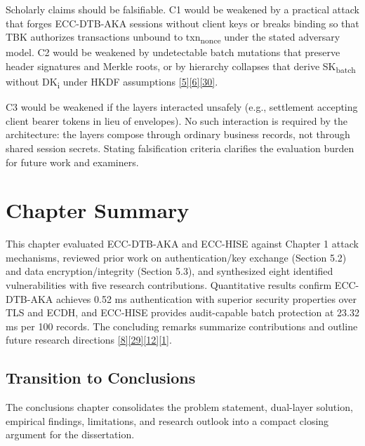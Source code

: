 \indent Scholarly claims should be falsifiable. C1 would be weakened by a practical attack that forges ECC-DTB-AKA sessions without client keys or breaks binding so that TBK authorizes transactions unbound to txn\textsubscript{nonce} under the stated adversary model. C2 would be weakened by undetectable batch mutations that preserve header signatures and Merkle roots, or by hierarchy collapses that derive SK\textsubscript{batch} without DK\textsubscript{i} under HKDF assumptions \hyperref[ref:5]{[5]}\hyperref[ref:6]{[6]}\hyperref[ref:30]{[30]}.

\indent C3 would be weakened if the layers interacted unsafely (e.g., settlement accepting client bearer tokens in lieu of envelopes). No such interaction is required by the architecture: the layers compose through ordinary business records, not through shared session secrets. Stating falsification criteria clarifies the evaluation burden for future work and examiners.

\section{Chapter Summary}

\indent This chapter evaluated ECC-DTB-AKA and ECC-HISE against Chapter 1 attack mechanisms, reviewed prior work on authentication/key exchange (Section 5.2) and data encryption/integrity (Section 5.3), and synthesized eight identified vulnerabilities with five research contributions. Quantitative results confirm ECC-DTB-AKA achieves 0.52 ms authentication with superior security properties over TLS and ECDH, and ECC-HISE provides audit-capable batch protection at 23.32 ms per 100 records. The concluding remarks summarize contributions and outline future research directions \hyperref[ref:8]{[8]}\hyperref[ref:29]{[29]}\hyperref[ref:12]{[12]}\hyperref[ref:1]{[1]}.

\subsection{Transition to Conclusions}

\indent The conclusions chapter consolidates the problem statement, dual-layer solution, empirical findings, limitations, and research outlook into a compact closing argument for the dissertation.

